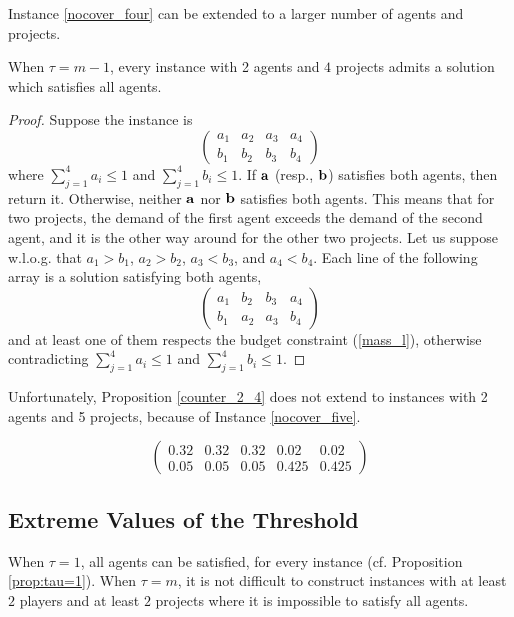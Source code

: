 \documentclass{article}
\begin{document}
Instance \ref{nocover_four} can be extended to a larger number of agents and projects.


\begin{proposition} \label{counter_2_4} When $\tau=m-1$, 
every instance with 2 agents and $4$ projects admits a solution which satisfies all agents.
\end{proposition}
\begin{proof} Suppose the instance is 
$$\left( \begin{array}{cccc}
a_1 & a_2 & a_3 & a_4\\
b_1 & b_2 & b_3 & b_4
\end{array} \right)$$
where $\sum_{j=1}^4 a_i \le 1$ and  $\sum_{j=1}^4 b_i \le 1$. If ${\bf a}$ (resp., ${\bf b}$) satisfies both agents, then return it. 
Otherwise, neither ${\bf a}$ nor ${\bf b}$ satisfies both agents. This means that for two projects, the demand of the first agent exceeds the demand of the second agent, and it is the other way around for the other two projects. Let us suppose w.l.o.g. that $a_1>b_1$, $a_2>b_2$, $a_3<b_3$, and $a_4<b_4$. Each line of the following array is a solution satisfying both agents,
$$\left( \begin{array}{cccc}
a_1 & b_2 & b_3 & a_4\\
b_1 & a_2 & a_3 & b_4
\end{array} \right)$$
and at least one of them respects the budget constraint (\ref{mass_l}), otherwise contradicting $\sum_{j=1}^4 a_i \leq 1$ and $\sum_{j=1}^4 b_i \leq 1$.
\end{proof}
Unfortunately, Proposition \ref{counter_2_4} does not extend to instances with 2 agents and 5 projects, because of Instance \ref{nocover_five}.  


\begin{instance}  \label{nocover_five}
$$\left( \begin{array}{ccccc}
0.32 & 0.32 & 0.32 & 0.02 & 0.02\\
0.05 & 0.05 & 0.05 & 0.425 & 0.425
\end{array} \right)$$ 
\end{instance}


\subsection{Extreme Values of the Threshold} \label{sec:extreme:classes}
When $\tau=1$, all agents 
can be satisfied, %
for every instance (cf. Proposition \ref{prop:tau=1}). When $\tau=m$, it is not difficult to construct instances with at least $2$ players and at least $2$ projects where it is impossible to satisfy all agents.     
\end{document}
